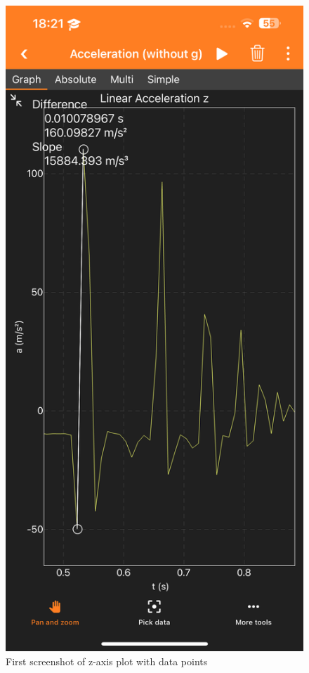 \documentclass[idxtotoc,hyperref,openany]{labbook} %
\begin{document}
\begin{figure}[H] %
\begin{center}
\includegraphics[width=.7\linewidth]{images/Lab.02/PhoneDropZAnnotated1.PNG}
\end{center}
\caption{First screenshot of z-axis plot with data points}
\label{fig:Lab02-PhoneDropZAnnotated1}
\end{figure}
\end{document}
